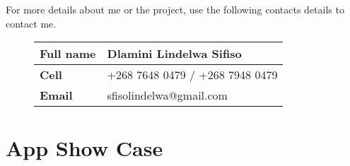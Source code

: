 \documentclass[11pt]{report}
\begin{document}
    For more details about me or the project, use the following contacts details to contact me.
    \begin{center}
        \begin{figure}[h]
            \centering
            \renewcommand{\arraystretch}{1.5}%
            \begin{tabularx}{\textwidth}{|X|X|}
                \hline\textbf{Full name} & Dlamini Lindelwa Sifiso         \\
                \hline\textbf{Cell}      & +268 7648 0479 / +268 7948 0479 \\
                \hline\textbf{Email}     & sfisolindelwa@gmail.com         \\\hline
            \end{tabularx}
        \end{figure}
    \end{center}

    \section*{App Show Case}\label{sec:showcase}
    
\end{document}
